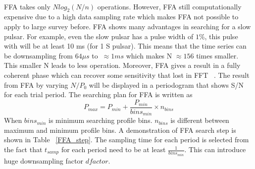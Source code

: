 \documentclass[thesis_msc.tex]{subfiles}
\begin{document}
        \paragraph{} FFA takes only $Nlog_2(N/n)$ operations. However, FFA still computationally expensive due to a high data sampling rate which makes FFA not possible to apply to large survey before. FFA shows many advantages in searching for a slow pulsar. For example, even the slow pulsar has a pulse width of $1\%$, this pulse with will be at least 10 ms (for 1 S pulsar). This means that the time series can be downsampling from $64 \mu s$ to $~\approx 1ms$ which makes N $\approx 156$ times smaller. This smaller N leads to less operation. Moreover, FFA gives a result in a fully coherent phase which can recover some sensitivity that lost in FFT ~\citep{kondratiev2009new}. The result from FFA by varying $N/P_0$ will be displayed in a periodogram that shows S/N for each trial period. The searching plan for FFA is written as 
        \begin{equation}
        P_{max}=P_{min}+\frac{P_{min}}{bins_{min}} \times n_{bins}
        \end{equation}
        When $bins_{min}$ is minimum searching profile bins. $n_{bins} $ is different between maximum and minimum profile bins. A demonstration of FFA search step is shown in Table ~\ref{FFA_step}. The sampling time for each period is selected from the fact that $t_{samp}$ for each period need to be at least $\frac{1}{bins_{min}}$. This can introduce huge downsampling factor $dfactor$. 
        
\end{document}
